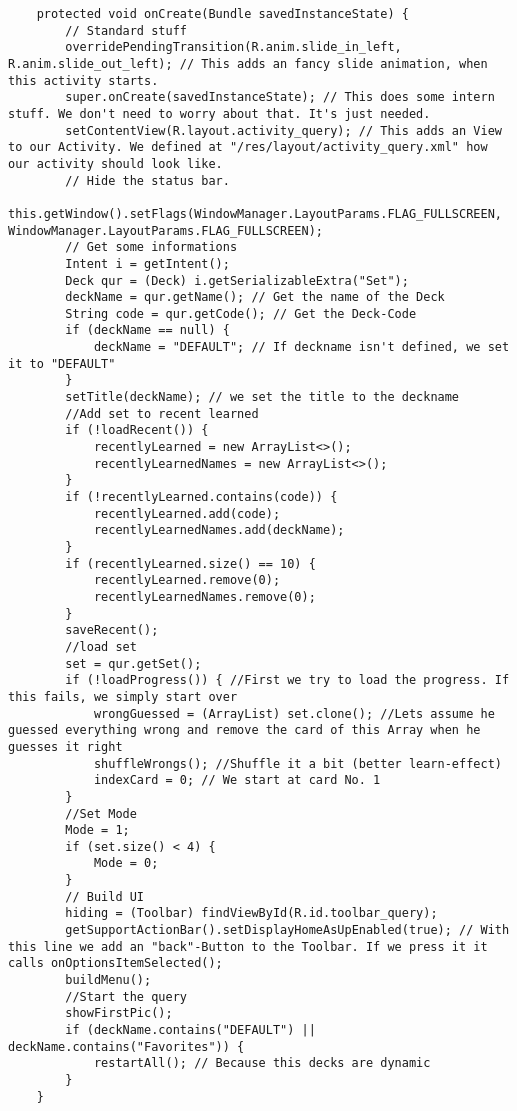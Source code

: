 \begin{lstlisting}
    protected void onCreate(Bundle savedInstanceState) {
        // Standard stuff
        overridePendingTransition(R.anim.slide_in_left, R.anim.slide_out_left); // This adds an fancy slide animation, when this activity starts.
        super.onCreate(savedInstanceState); // This does some intern stuff. We don't need to worry about that. It's just needed.
        setContentView(R.layout.activity_query); // This adds an View to our Activity. We defined at "/res/layout/activity_query.xml" how our activity should look like.
        // Hide the status bar.
        this.getWindow().setFlags(WindowManager.LayoutParams.FLAG_FULLSCREEN, WindowManager.LayoutParams.FLAG_FULLSCREEN);
        // Get some informations
        Intent i = getIntent();
        Deck qur = (Deck) i.getSerializableExtra("Set");
        deckName = qur.getName(); // Get the name of the Deck
        String code = qur.getCode(); // Get the Deck-Code
        if (deckName == null) {
            deckName = "DEFAULT"; // If deckname isn't defined, we set it to "DEFAULT"
        }
        setTitle(deckName); // we set the title to the deckname
        //Add set to recent learned
        if (!loadRecent()) {
            recentlyLearned = new ArrayList<>();
            recentlyLearnedNames = new ArrayList<>();
        }
        if (!recentlyLearned.contains(code)) {
            recentlyLearned.add(code);
            recentlyLearnedNames.add(deckName);
        }
        if (recentlyLearned.size() == 10) {
            recentlyLearned.remove(0);
            recentlyLearnedNames.remove(0);
        }
        saveRecent();
        //load set
        set = qur.getSet();
        if (!loadProgress()) { //First we try to load the progress. If this fails, we simply start over
            wrongGuessed = (ArrayList) set.clone(); //Lets assume he guessed everything wrong and remove the card of this Array when he guesses it right
            shuffleWrongs(); //Shuffle it a bit (better learn-effect)
            indexCard = 0; // We start at card No. 1
        }
        //Set Mode
        Mode = 1;
        if (set.size() < 4) {
            Mode = 0;
        }
        // Build UI
        hiding = (Toolbar) findViewById(R.id.toolbar_query);
        getSupportActionBar().setDisplayHomeAsUpEnabled(true); // With this line we add an "back"-Button to the Toolbar. If we press it it calls onOptionsItemSelected();
        buildMenu();
        //Start the query
        showFirstPic();
        if (deckName.contains("DEFAULT") || deckName.contains("Favorites")) {
            restartAll(); // Because this decks are dynamic
        }
    }


\end{lstlisting}
